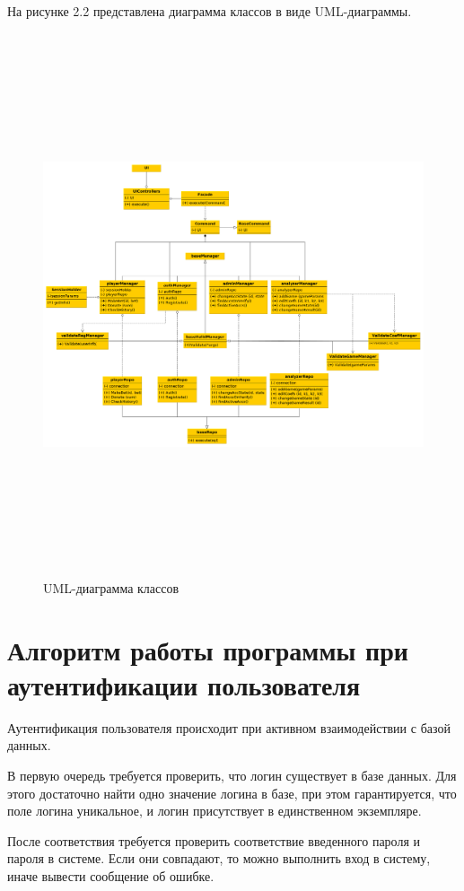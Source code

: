 На рисунке 2.2 представлена диаграмма классов в виде UML-диаграммы.
\FloatBarrier
\begin{figure}[hp]	
	\begin{center}
		\includegraphics[angle=90, width=\linewidth, height=16cm]{inc/uml.png}
	\end{center}
	\caption{UML-диаграмма классов}
	\label{fig::uml}
\end{figure}
\FloatBarrier

\section{Алгоритм работы программы при аутентификации пользователя}
Аутентификация пользователя происходит при активном взаимодействии с базой данных.

В первую очередь требуется проверить, что логин существует в базе данных. 
Для этого достаточно найти одно значение логина в базе, при этом гарантируется, что поле логина уникальное, и логин присутствует в единственном экземпляре.

После соответствия требуется проверить соответствие введенного пароля и пароля в системе. 
Если они совпадают, то можно выполнить вход в систему, иначе вывести сообщение об ошибке.

